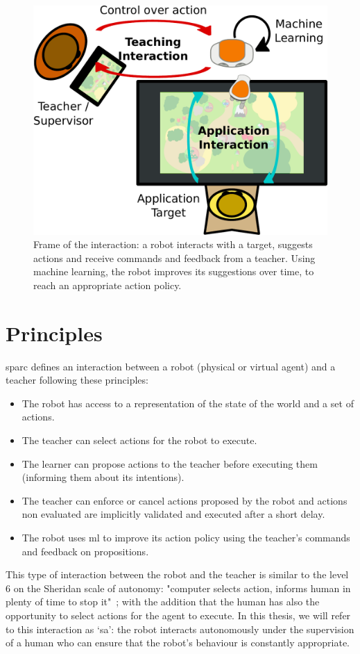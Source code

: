 \begin{figure}[ht]
	\includegraphics[width=.6\linewidth]{setup.pdf}
	\centering
	\caption{Frame of the interaction: a robot interacts with a target, suggests actions and receive commands and feedback from a teacher. Using machine learning, the robot improves its suggestions over time, to reach an appropriate action policy.}
	\label{fig:frame}
\end{figure}

\section{Principles} \label{sec:sparc_principles}

\gls{sparc} defines an interaction between a robot (physical or virtual agent) and a teacher following these principles:
\begin{itemize}
	\item The robot has access to a representation of the state of the world and a set of actions.
	\item The teacher can select actions for the robot to execute.
	\item The learner can propose actions to the teacher before executing them (informing them about its intentions).
	\item The teacher can enforce or cancel actions proposed by the robot and actions non evaluated are implicitly validated and executed after a short delay.
	\item The robot uses \gls{ml} to improve its action policy using the teacher's commands and feedback on propositions.
\end{itemize} 

This type of interaction between the robot and the teacher is similar to the level 6 on the Sheridan scale of autonomy: "computer selects action, informs human in plenty of time to stop it"~\citep{sheridan1978human}; with the addition that the human has also the opportunity to select actions for the agent to execute. In this thesis, we will refer to this interaction as `\gls{sa}': the robot interacts autonomously under the supervision of a human who can ensure that the robot's behaviour is constantly appropriate.

